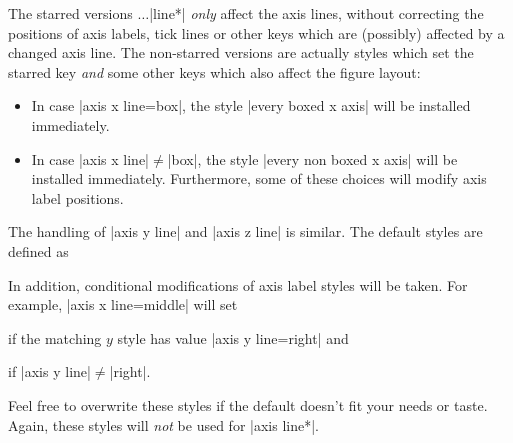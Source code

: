 \begin{pgfplotskeylist}
The starred versions $\dotsc$|line*| \emph{only} affect the axis lines, without correcting the positions of axis labels, tick lines or other keys which are (possibly) affected by a changed axis line. The non-starred versions are actually styles which set the starred key \emph{and} some other keys which also affect the figure layout:
\begin{itemize}
	\item In case |axis x line=box|, the style |every boxed x axis| will be installed immediately.
	\item In case |axis x line|$\neq$|box|, the style |every non boxed x axis| will be installed immediately. Furthermore, some of these choices will modify axis label positions.
\end{itemize}
The handling of |axis y line| and |axis z line| is similar. The default styles are defined as
\begin{codeexample}
\end{codeexample}
In addition, conditional modifications of axis label styles will be taken. For example, |axis x line=middle| will set
\begin{codeexample}
\end{codeexample}
if the matching $y$ style has value |axis y line=right| and 
\begin{codeexample}
\end{codeexample}
if |axis y line|$\neq$|right|.

Feel free to overwrite these styles if the default doesn't fit your needs or taste. Again, these styles will \emph{not} be used for |axis line*|. 

\begin{codeexample}[]
\end{codeexample}

\begin{codeexample}[]
\end{codeexample}



\end{pgfplotskeylist}
